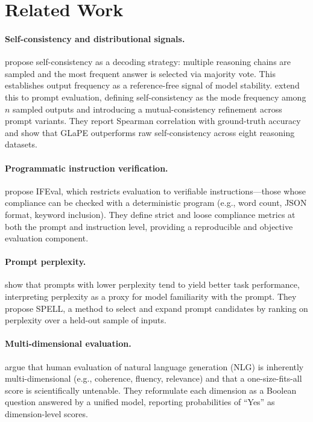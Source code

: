 \documentclass[11pt,a4paper]{article}
\begin{document}
\section{Related Work}

\paragraph{Self-consistency and distributional signals.}
\citet{selfconsistency2023} propose self-consistency as a decoding strategy: multiple reasoning chains are sampled and the most frequent answer is selected via majority vote. This establishes output frequency as a reference-free signal of model stability. \citet{glape2024} extend this to prompt evaluation, defining self-consistency as the mode frequency among $n$ sampled outputs and introducing a mutual-consistency refinement across prompt variants. They report Spearman correlation with ground-truth accuracy and show that GLaPE outperforms raw self-consistency across eight reasoning datasets.

\paragraph{Programmatic instruction verification.}
\citet{ifeval2023} propose IFEval, which restricts evaluation to verifiable instructions—those whose compliance can be checked with a deterministic program (e.g., word count, JSON format, keyword inclusion). They define strict and loose compliance metrics at both the prompt and instruction level, providing a reproducible and objective evaluation component.

\paragraph{Prompt perplexity.}
\citet{promptperplexity2022} show that prompts with lower perplexity tend to yield better task performance, interpreting perplexity as a proxy for model familiarity with the prompt. They propose SPELL, a method to select and expand prompt candidates by ranking on perplexity over a held-out sample of inputs.

\paragraph{Multi-dimensional evaluation.}
\citet{unieval2022} argue that human evaluation of natural language generation (NLG) is inherently multi-dimensional (e.g., coherence, fluency, relevance) and that a one-size-fits-all score is scientifically untenable. They reformulate each dimension as a Boolean question answered by a unified model, reporting probabilities of ``Yes'' as dimension-level scores.
\end{document}
